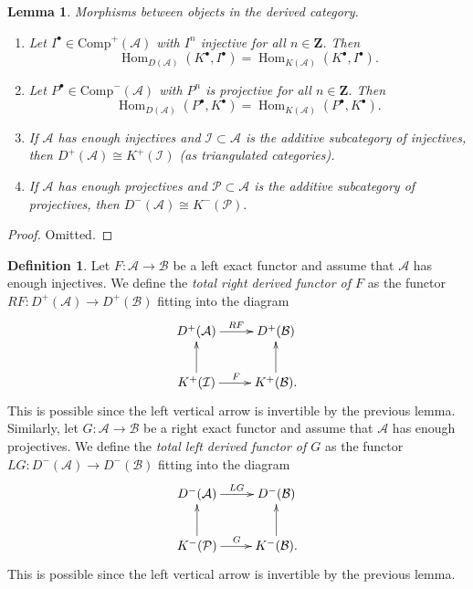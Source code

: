 \documentclass{stacks-project}
\theoremstyle{plain}
\newtheorem{lemma}[subsection]{Lemma}
\theoremstyle{definition}
\newtheorem{definition}[subsection]{Definition}
\theoremstyle{remark}
\numberwithin{equation}{subsection}
\def\Hom{\mathop{\mathrm{Hom}}\nolimits}
\begin{document}
\begin{lemma}
\label{lemma-derived-categories}
Morphisms between objects in the derived category.
\begin{enumerate}
\item
Let $I^\bullet \in \text{Comp}^+(\mathcal{A})$ with $I^n$ injective for all
$n \in \mathbf{Z}$. Then
$$
\Hom_{D(\mathcal{A})}(K^\bullet, I^\bullet)
=
\Hom_{K(\mathcal{A})}(K^\bullet, I^\bullet).
$$
\item
Let $P^\bullet \in \text{Comp}^-(\mathcal{A})$ with $P^n$ is projective for all
$n \in \mathbf{Z}$. Then
$$
\Hom_{D(\mathcal{A})}(P^\bullet, K^\bullet)
=
\Hom_{K(\mathcal{A})}(P^\bullet, K^\bullet).
$$
\item
If $\mathcal{A}$ has enough injectives and $\mathcal{I} \subset \mathcal{A}$
is the additive subcategory of injectives, then
$
D^+(\mathcal{A})\cong K^+(\mathcal{I})
$
(as triangulated categories).
\item
If $\mathcal{A}$ has enough projectives and $\mathcal{P} \subset \mathcal{A}$
is the additive subcategory of projectives, then
$
D^-(\mathcal{A}) \cong K^-(\mathcal{P}).
$
\end{enumerate}
\end{lemma}

\begin{proof}
Omitted.
\end{proof}

\begin{definition}
\label{definition-derived-functor}
Let $F: \mathcal{A} \to \mathcal{B}$ be a left exact functor and assume that
$\mathcal{A}$ has enough injectives. We define the {\it total right derived
functor of $F$} as the functor $RF: D^+(\mathcal{A}) \to D^+(\mathcal{B})$
fitting into the diagram
$$
\xymatrix{
D^+(\mathcal{A}) \ar[r]^{RF} & D^+(\mathcal{B}) \\
K^+(\mathcal I) \ar[u] \ar[r]^F & K^+(\mathcal{B}). \ar[u]
}
$$
This is possible since the left vertical arrow is invertible by the previous
lemma. Similarly, let $G: \mathcal{A} \to \mathcal{B}$ be a right exact
functor and assume that $\mathcal{A}$ has enough projectives. We define the
{\it total left derived functor of $G$} as the functor $LG: D^-(\mathcal{A})
\to D^-(\mathcal{B})$ fitting into the diagram
$$
\xymatrix{
D^-(\mathcal{A}) \ar[r]^{LG} & D^-(\mathcal{B}) \\
K^-(\mathcal{P}) \ar[u] \ar[r]^G & K^-(\mathcal{B}). \ar[u]
}
$$
This is possible since the left vertical arrow is invertible by the previous
lemma.
\end{definition}
\end{document}

